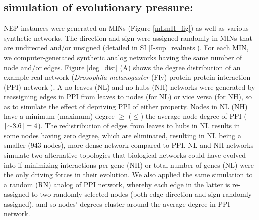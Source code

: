 \subsection{simulation of evolutionary pressure:}
      NEP instances were generated on MINs (Figure \ref{mLmH_fig}) as well as various synthetic networks. The direction and sign were assigned randomly in MINs that are undirected and/or unsigned (detailed in SI \ref{I-sup_realnets}). For each MIN, we computer-generated synthetic analog networks having the same number of node and/or edges. Figure \ref{deg_dist} (A) shows the degree distribution of an example real network (\textit{Drosophila melanogaster} (Fly) protein-protein interaction (PPI) network \cite{vinayagam_integrating_2014}).
      A no-leaves (NL) and no-hubs (NH) networks were generated by reassigning edges in PPI from leaves to nodes (for NL) or vice versa (for NH),
      so as to simulate the effect of depriving PPI of either property.
      Nodes in NL (NH) have a minimum (maximum) degree  $\geq$ ($\leq$) the average
      node degree of PPI ($\ceil{{\sim}3.6}=4$). The redistribution of edges from leaves to hubs in NL results in some nodes having zero degree, which are eliminated,
      resulting in NL being a smaller (943 nodes), more dense network compared to PPI.
      NL and NH networks
      simulate two alternative topologies that biological networks could have evolved into if minimizing interactions per gene (NH) or total number of genes (NL)
      were the only driving forces in their evolution.
      We also applied the same simulation to a random (RN)  analog of PPI network, whereby each edge in the latter is re-assigned to two randomly selected nodes
      (both edge direction and sign
      randomly assigned), and so nodes' degrees cluster around the average degree in PPI network.
